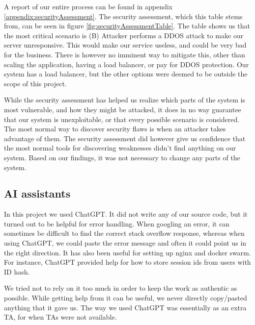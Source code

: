 A report of our entire process can be found in appendix \ref{appendix:securityAssessment}. The security assessment, which this table stems from, can be seen in figure \ref{fig:securityAssessmentTable}. The table shows us that the most critical scenario is (B) Attacker performs a DDOS attack to make our server unresponsive. This would make our service useless, and could be very bad for the business. There is however no imminent way to mitigate this, other than scaling the application, having a load balancer, or pay for DDOS protection. Our system has a load balancer, but the other options were deemed to be outside the scope of this project.

While the security assessment has helped us realize which parts of the system is most vulnerable, and how they might be attacked, it does in no way guarantee that our system is unexploitable, or that every possible scenario is considered. The most normal way to discover security flaws is when an attacker takes advantage of them. The security assessment did however give us confidence that the most normal tools for discovering weaknesses didn't find anything on our system. Based on our findings, it was not necessary to change any parts of the system.

\subsection{AI assistants}
In this project we used ChatGPT. It did not write any of our source code, but it turned out to be helpful for error handling. When googling an error, it can sometimes be difficult to find the correct stack overflow response, whereas when using ChatGPT, we could paste the error message and often it could point us in the right direction. It has also been useful for setting up nginx and docker swarm. For instance, ChatGPT provided help for how to store session ids from users with ID hash.

We tried not to rely on it too much in order to keep the work as authentic as possible. While getting help from it can be useful, we never directly copy/pasted anything that it gave us. The way we used ChatGPT was essentially as an extra TA, for when TAs were not available.
